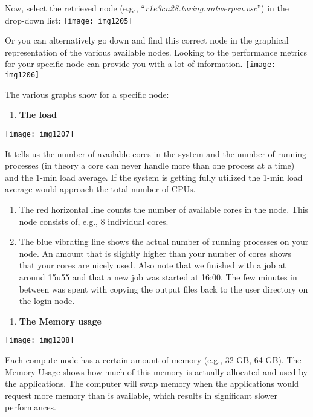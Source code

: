 Now, select the retrieved node (e.g., ``\textit{r1e3cn28.turing.antwerpen.vsc}'') in the drop-down list:
\texttt{[image: img1205]}

Or you can alternatively go down and find this correct node in the graphical representation of the various available nodes.
Looking to the performance metrics for your specific node can provide you with a lot of information.
\texttt{[image: img1206]}

The various graphs show for a specific node:

\begin{enumerate}
\item  \textbf{The load}
\end{enumerate}


\texttt{[image: img1207]}

It tells us the number of available cores in the system and the number of running processes (in theory a core can never handle more than one process at a time) and the 1-min load average. If the system is getting fully utilized the 1-min load average would approach the total number of CPUs.

\begin{enumerate}
\item The red horizontal line counts the number of available cores in the node. This node consists of, e.g., 8 individual cores.
\item  The blue vibrating line shows the actual number of running processes on your node. An amount that is slightly higher than your number of cores shows that your cores are nicely used. Also note that we finished with a job at around 15u55 and that a new job was started at 16:00. The few minutes in between was spent with copying the output files back to the user directory on the login node.
\end{enumerate}

\begin{enumerate}
\item  \textbf{The Memory usage}
\end{enumerate}

\texttt{[image: img1208]}

Each compute node has a certain amount of memory (e.g., 32 GB, 64 GB).  The Memory Usage shows how much of this memory is actually allocated and used by the applications.  The computer will swap memory when the applications would request more memory than is available, which results in significant slower performances.

